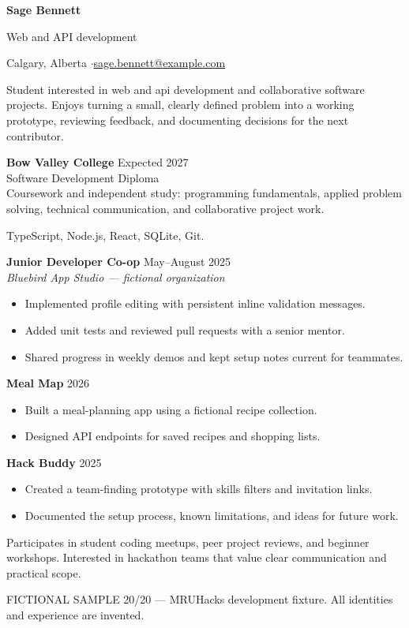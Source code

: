 
{\Huge\bfseries Sage Bennett}\par
{\large\color{accent} Web and API development}\par
Calgary, Alberta \enspace$\cdot$\enspace \href{mailto:sage.bennett@example.com}{sage.bennett@example.com}

Student interested in web and api development and collaborative software projects.
Enjoys turning a small, clearly defined problem into a working prototype,
reviewing feedback, and documenting decisions for the next contributor.

\textbf{Bow Valley College} \hfill Expected 2027\\
Software Development Diploma\\
Coursework and independent study: programming fundamentals, applied problem solving,
technical communication, and collaborative project work.

TypeScript, Node.js, React, SQLite, Git.

\textbf{Junior Developer Co-op} \hfill May--August 2025\\
\textit{Bluebird App Studio --- fictional organization}
\begin{itemize}
\item Implemented profile editing with persistent inline validation messages.
\item Added unit tests and reviewed pull requests with a senior mentor.
\item Shared progress in weekly demos and kept setup notes current for teammates.
\end{itemize}

\textbf{Meal Map} \hfill 2026
\begin{itemize}
\item Built a meal-planning app using a fictional recipe collection.
\item Designed API endpoints for saved recipes and shopping lists.
\end{itemize}
\textbf{Hack Buddy} \hfill 2025
\begin{itemize}
\item Created a team-finding prototype with skills filters and invitation links.
\item Documented the setup process, known limitations, and ideas for future work.
\end{itemize}

Participates in student coding meetups, peer project reviews, and beginner workshops.
Interested in hackathon teams that value clear communication and practical scope.

\vfill
{\footnotesize\color{gray} FICTIONAL SAMPLE 20/20 --- MRUHacks development fixture.
All identities and experience are invented.}

